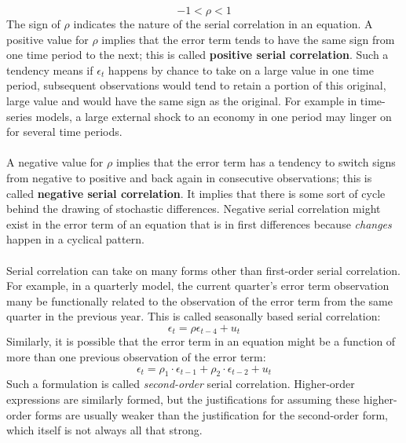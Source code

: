 \documentclass[11pt]{article}
\begin{document}
\begin{equation}
-1 < \rho < 1 \label{eg9_2}
\end{equation}
The sign of $\rho$ indicates the nature of the serial correlation in an equation. A positive value for $\rho$ implies that the error term tends to have the same sign from one time period to the next; this is called \textbf{positive serial correlation}. Such a tendency means if $\epsilon_t$ happens by chance to take on a large value in one time period, subsequent observations would tend to retain a portion of this original, large value and would have the same sign as the original. For example in time-series models, a large external shock to an economy in one period may linger on for several time periods. \\ \\
A negative value for $\rho$ implies that the error term has a tendency to switch signs from negative to positive and back again in consecutive observations; this is called \textbf{negative serial correlation}. It implies that there is some sort of cycle behind the drawing of stochastic differences. Negative serial correlation might exist in the error term of an equation that is in first differences because \textit{changes} happen in a cyclical pattern. \\ \\
Serial correlation can take on many forms other than first-order serial correlation. For example, in a quarterly model, the current quarter's error term observation many be functionally related to the observation of the error term from the same quarter in the previous year. This is called seasonally based serial correlation:
$$
\epsilon_t = \rho\epsilon_{t-4} + u_t
$$
Similarly, it is possible that the error term in an equation might be a function of more than one previous observation of the error term:
$$
\epsilon_t = \rho_1 \cdot\epsilon_{t-1} + \rho_2 \cdot\epsilon_{t-2} + u_t
$$
Such a formulation is called \textit{second-order} serial correlation. Higher-order expressions are similarly formed, but the justifications for assuming these higher-order forms are usually weaker than the justification for the second-order form, which itself is not always all that strong.
\end{document}
